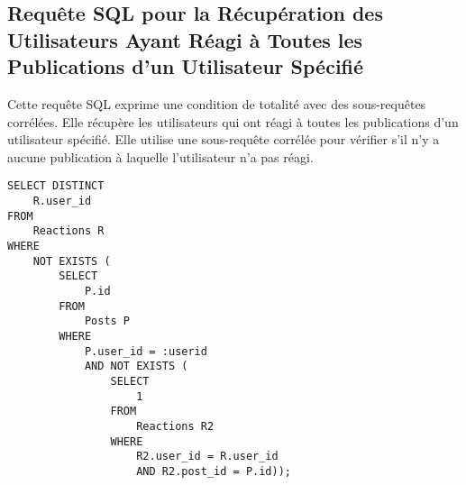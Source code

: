 \subsection{Requête SQL pour la Récupération des Utilisateurs Ayant Réagi à Toutes les Publications d'un Utilisateur Spécifié}

Cette requête SQL exprime une condition de totalité avec des sous-requêtes corrélées. Elle récupère les utilisateurs qui ont réagi à toutes les publications d'un utilisateur spécifié. Elle utilise une sous-requête corrélée pour vérifier s'il n'y a aucune publication à laquelle l'utilisateur n'a pas réagi.

\begin{lstlisting}
SELECT DISTINCT
    R.user_id
FROM
    Reactions R
WHERE
    NOT EXISTS (
        SELECT
            P.id
        FROM
            Posts P
        WHERE
            P.user_id = :userid
            AND NOT EXISTS (
                SELECT
                    1
                FROM
                    Reactions R2
                WHERE
                    R2.user_id = R.user_id
                    AND R2.post_id = P.id));
\end{lstlisting}